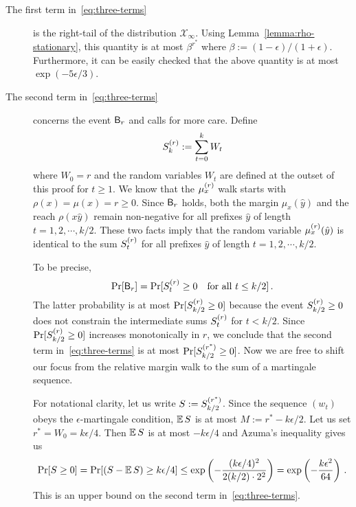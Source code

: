 \begin{description}
  \item[The first term in~\eqref{eq:three-terms}] is the right-tail of the distribution $\mathcal{X}_\infty$. 
  Using Lemma~\ref{lemma:rho-stationary}, 
  this quantity is at most $\beta^{r^*}$ where $\beta := (1-\epsilon)/(1+\epsilon)$. 
  Furthermore, it can be easily checked that the above quantity is at most $\exp(-5 \epsilon/3)$.

  \item[The second term in~\eqref{eq:three-terms} ]
  concerns the event
  $\mathsf{B}_r$ and calls for more care.  Define
  \[
    S_k^{(r)} := \sum_{t=0}^k {W_t}
  \]
  where $W_0 = r$ and the random variables $W_t$ are defined at the
  outset of this proof for $t \geq 1$.  We know that the $\mu_x^{(r)}$ walk
  starts with $\rho(x) = \mu(x) = r \geq 0$.  Since $\mathsf{B}_r$ holds,
  both the margin $\mu_x(\hat{y})$ and the reach $\rho(x\hat{y})$ remain
  non-negative for all prefixes $\hat{y}$ of length
  $t = 1, 2, \cdots, k/2$.  These two facts imply that the random
  variable $\mu_x^{(r)}(\hat{y})$ is identical to the sum $S^{(r)}_t$ for all
  prefixes $\hat{y}$ of length $t = 1, 2, \cdots, k/2$.

  To be precise,
  \[
    \Pr[\mathsf{B}_r] = \Pr[S^{(r)}_t \geq 0 \quad \text{for all } t \leq k/2]\,.
  \]
  The latter probability is at most $\Pr[S^{(r)}_{k/2} \geq 0]$ because the
  event $S^{(r)}_{k/2} \geq 0$ does not constrain the intermediate sums
  $S^{(r)}_t$ for $t < k/2$.  Since $\Pr[S^{(r)}_{k/2} \geq 0]$ increases
  monotonically in $r$, we conclude that the second term
  in~\eqref{eq:three-terms} is at most $\Pr[S^{(r^*)}_{k/2} \geq 0]$.  Now
  we are free to shift our focus from the relative margin walk to the
  sum of a martingale sequence.

  For notational clarity, let us write $S := S^{(r^*)}_{k/2}$. 
  Since the sequence $(w_t)$ obeys the $\epsilon$-martingale condition, 
  $\operatorname{\mathbb{E}} S$ is at most $M := r^* - k\epsilon/2$. 
  Let us set $r^* = W_0 = k\epsilon/4$. Then $\operatorname{\mathbb{E}} S$ is at most $-k\epsilon/4$ and Azuma's inequality gives us
  \[
  \Pr[S \geq 0] 
  = \Pr[(S - \operatorname{\mathbb{E}} S) \geq k\epsilon/4] 
  \leq \exp\left( - \frac{(k\epsilon/4)^2}{2(k/2)\cdot 2^2}\right) 
  = \exp\left( -\frac{k \epsilon^2}{64} \right)
  \, .
  \]
  This is an upper bound on the second term in~\eqref{eq:three-terms}.


\end{description}
